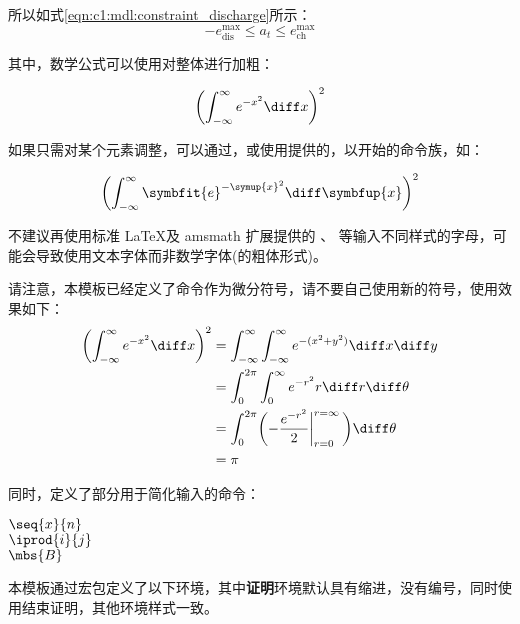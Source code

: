 所以如式\eqref{eqn:c1:mdl:constraint_discharge}所示：
\begin{equation}
    -e^{\max}_\text{dis} \leq a_t \leq e^{\max}_\text{ch}
\end{equation}

其中，数学公式可以使用对整体进行加粗：

\begin{texcode}[]{}
\boldmath
\begin{equation}
  \biggl(\int_{-\infty}^\infty e^{-x^2}\diff x\biggr)^2 
\end{equation}
\unboldmath
\end{texcode}

如果只需对某个元素调整，可以通过\clist{\boldsymbol}，或使用提供的，以\clist{\sym}开始的命令族，如\clist{\symup, \symbfup, \symit, \symbfit}：
\begin{texcode}[]{}
  \begin{equation}
    \biggl(\int_{-\infty}^\infty \symbfit{e}^{-\symup{x}^2}\diff \symbfup{x}\biggr)^2 
  \end{equation}
\end{texcode}
不建议再使用标准 \LaTeX 及 amsmath 扩展提供的 \clist{\mathbf}、\clist{\mathcal} 等输入不同样式的字母，可能会导致使用文本字体而非数学字体(的粗体形式)。

请注意，本模板已经定义了\clist{\diff}命令作为微分符号，请不要自己使用新的符号，使用效果如下：
\begin{align}\label{eqn:c1:diff}
  \biggl(\int_{-\infty}^\infty e^{-x^2}\diff x\biggr)^2 
    &= \int_{-\infty}^\infty\int_{-\infty}^\infty e^{-(x^2+y^2)}\diff x\diff y \\
    &= \int_0^{2\pi}\int_0^\infty e^{-r^2}r\diff r\diff\theta \\
    &= \int_0^{2\pi}\biggl(-{e^{-r^2}\over2}\bigg\vert_{r=0}^{r=\infty}\,\biggr)\diff\theta \\
    &= \pi
\end{align}


同时，定义了部分用于简化输入的命令：

\begin{texcode}[sidebyside]{}
  $\seq{x}{n}$ \\ %
  $\iprod{i}{j}$ \\ %
  $\mbs{B}$  %
\end{texcode}


本模板通过宏包定义了以下环境，其中\textbf{证明}环境默认具有缩进，没有编号，同时使用\clist{\qedhere}结束证明，其他环境样式一致。

